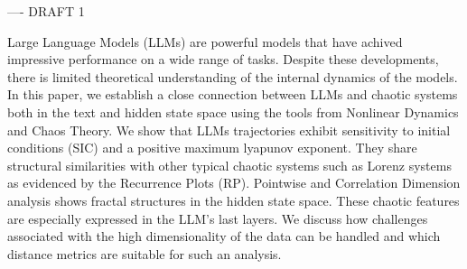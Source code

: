 ---- DRAFT 1


Large Language Models (LLMs) are powerful models that have achived impressive performance on a wide range of tasks.
Despite these developments, there is limited theoretical understanding of the internal dynamics of the models. In this paper, we establish a close connection between LLMs and chaotic systems both in the text and hidden state space using the tools from Nonlinear Dynamics and Chaos Theory. We show that LLMs 
trajectories exhibit sensitivity to initial conditions (SIC) and a positive maximum lyapunov exponent. They share structural similarities with other typical chaotic systems such as Lorenz systems as evidenced by the Recurrence Plots (RP). Pointwise and Correlation Dimension analysis shows fractal structures in the hidden state space. These chaotic features are especially expressed in the LLM's last layers. We discuss how challenges associated with the high dimensionality of the data can be handled and which distance metrics are suitable for such an analysis.







